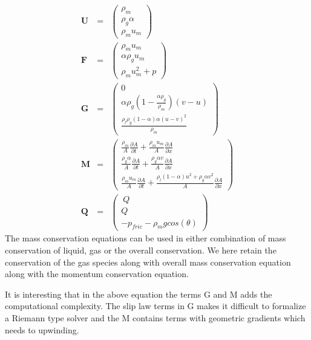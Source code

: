 \documentclass[a4paper,16pt]{article}
\begin{document}
\begin{eqnarray}
 \textbf{U} &=& \left( \begin{array}{c} \rho_m  \\ \rho_g \alpha  \\ \rho_m u_m  \end{array} \right)\\
 \textbf{F} &=& \left( \begin{array}{c} \rho_m u_m  \\ \alpha \rho_{g} u_m \\ {\rho_m u_m ^2 + p}  \end{array} \right)\\
  \textbf{G} &=& \left( \begin{array}{c} 0  \\ \alpha \rho_{g} (1-\frac{\alpha \rho_{g}}{\rho_m})(v-u)  \\ \frac{\rho_l \rho_g (1-\alpha)\alpha (u-v)^2}{\rho_m}  \end{array} \right)\\
  \textbf{M} &=& \left( \begin{array}{c} \frac{\rho_m}{A}\frac{\partial A}{\partial t} + \frac{\rho_m u_m}{A}\frac{\partial A}{\partial x} \\ \frac{\rho_g \alpha}{A}\frac{\partial A}{\partial t} + \frac{\rho_g \alpha v}{A}\frac{\partial A}{\partial x}  \\ \frac{\rho_m u_m}{A}\frac{\partial A}{\partial t} + \frac{\rho_l (1-\alpha) u^2 +\rho_g \alpha v^2}{A}\frac{\partial A}{\partial x}   \end{array} \right)\\
  \textbf{Q} &=& \left( \begin{array}{c} \ Q \\ Q  \\ -p_{fric} - \rho_m g cos(\theta)  \end{array} \right)
\end{eqnarray}
The mass conservation equations can be used in either combination of mass conservation of liquid, gas or the overall conservation. We here retain the conservation of the gas species along with overall mass conservation equation along with the momentum conservation equation. 

It is interesting that in the above equation the terms G and M adds the computational complexity. The slip law terms in G makes it difficult to formalize a Riemann type solver and the M contains terms with geometric gradients which needs to upwinding. 
\end{document}
